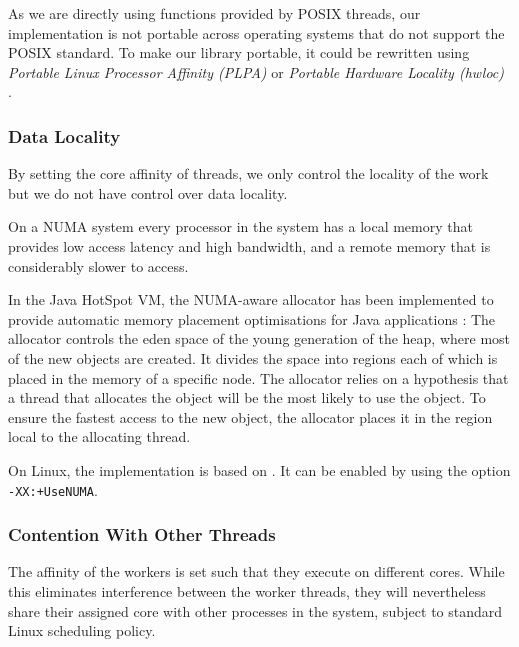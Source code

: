As we are directly using functions provided by POSIX threads, our
implementation is not portable across operating systems that do not
support the POSIX standard. To make our library portable, it could be
rewritten using \emph{Portable Linux Processor Affinity (PLPA)}
\cite{OpenMPI2010a} or \emph{Portable Hardware Locality (hwloc)}
\cite{OpenMPI2010}.

\subsubsection{Data Locality}

By setting the core affinity of threads, we only control the locality
of the work but we do not have control over data locality.

On a NUMA system every processor in the system has a local memory that
provides low access latency and high bandwidth, and a remote memory
that is considerably slower to access.

In the Java HotSpot VM, the NUMA-aware allocator has been implemented
to provide automatic memory placement optimisations for Java
applications \cite{Masamitsu2008, Oracle2010, Humble2010}: The
allocator controls the eden space of the young generation of the heap,
where most of the new objects are created. It divides the space into
regions each of which is placed in the memory of a specific node. The
allocator relies on a hypothesis that a thread that allocates the
object will be the most likely to use the object. To ensure the
fastest access to the new object, the allocator places it in the
region local to the allocating thread.

On Linux, the implementation is based on \cite{Kleen2004}. It can be
enabled by using the option \verb!-XX:+UseNUMA!.

\subsubsection{Contention With Other Threads}

The affinity of the workers is set such that they execute on different
cores. While this eliminates interference between the worker threads,
they will nevertheless share their assigned core with other processes
in the system, subject to standard Linux scheduling policy.


